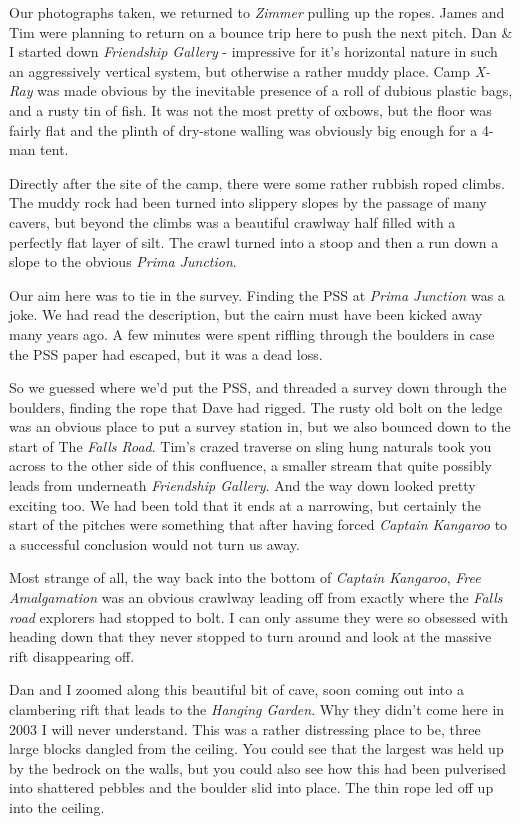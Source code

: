 Our photographs taken, we returned to \emph{Zimmer} pulling up the
ropes. James and Tim were planning to return on a bounce trip here to
push the next pitch. Dan \& I started down \emph{Friendship Gallery} -
impressive for it's horizontal nature in such an aggressively vertical
system, but otherwise a rather muddy place. Camp \emph{X-Ray} was made
obvious by the inevitable presence of a roll of dubious plastic bags,
and a rusty tin of fish. It was not the most pretty of oxbows, but the
floor was fairly flat and the plinth of dry-stone walling was obviously
big enough for a 4-man tent.

Directly after the site of the camp, there were some rather rubbish
roped climbs. The muddy rock had been turned into slippery slopes by the
passage of many cavers, but beyond the climbs was a beautiful crawlway
half filled with a perfectly flat layer of silt. The crawl turned into a
stoop and then a run down a slope to the obvious \emph{Prima Junction}.

Our aim here was to tie in the survey. Finding the PSS at \emph{Prima
Junction} was a joke. We had read the description, but the cairn must
have been kicked away many years ago. A few minutes were spent riffling
through the boulders in case the PSS paper had escaped, but it was a
dead loss.

So we guessed where we'd put the PSS, and threaded a survey down through
the boulders, finding the rope that Dave had rigged. The rusty old bolt
on the ledge was an obvious place to put a survey station in, but we
also bounced down to the start of The \emph{Falls Road}. Tim's crazed
traverse on sling hung naturals took you across to the other side of
this confluence, a smaller stream that quite possibly leads from
underneath \emph{Friendship Gallery}. And the way down looked pretty
exciting too. We had been told that it ends at a narrowing, but
certainly the start of the pitches were something that after having
forced \emph{Captain Kangaroo} to a successful conclusion would not turn
us away.

Most strange of all, the way back into the bottom of \emph{Captain
Kangaroo}, \emph{Free Amalgamation} was an obvious crawlway leading off
from exactly where the \emph{Falls road} explorers had stopped to bolt.
I can only assume they were so obsessed with heading down that they
never stopped to turn around and look at the massive rift disappearing
off.

Dan and I zoomed along this beautiful bit of cave, soon coming out into
a clambering rift that leads to the \emph{Hanging Garden}. Why they
didn't come here in 2003 I will never understand. This was a rather
distressing place to be, three large blocks dangled from the ceiling.
You could see that the largest was held up by the bedrock on the walls,
but you could also see how this had been pulverised into shattered
pebbles and the boulder slid into place. The thin rope led off up into
the ceiling.

